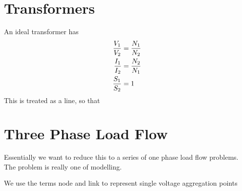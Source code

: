\documentclass[11pt]{article}
\begin{document}
\section{Transformers}
An ideal transformer has
\begin{align}
	\frac{V_1}{V_2} &= \frac{N_1}{N_2} \notag \\
	\frac{I_1}{I_2} &= \frac{N_2}{N_1} \notag \\
	\frac{S_1}{S_2} &= 1
\end{align}
This is treated as a line, so that 

\section{Three Phase Load Flow}
Essentially we want to reduce this to a series of one phase load flow problems. The problem is really one of modelling.

We use the terms node and link to represent single voltage aggregation points 
\end{document}
